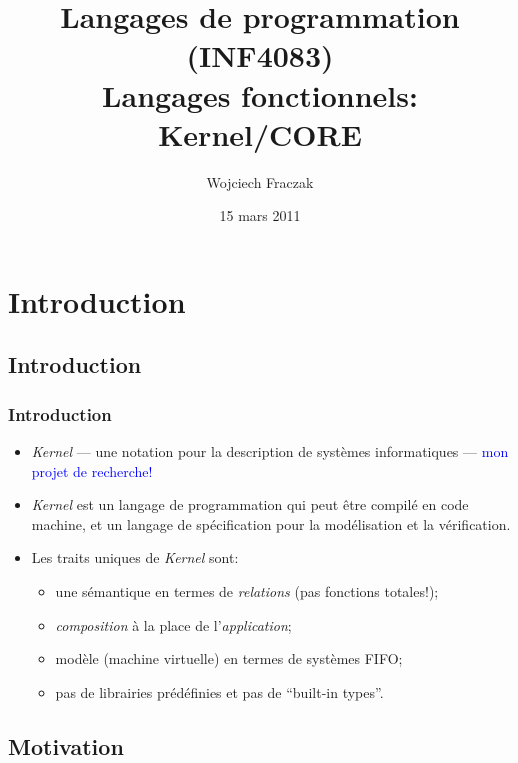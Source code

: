 \documentclass{beamer}
\title[INF4083: Kernel/CORE]{Langages de programmation (INF4083) \\
  Langages fonctionnels: Kernel/CORE}
\author{Wojciech Fraczak}
\date{15 mars 2011}
\newcommand{\mypause}{\pause}
\newcommand{\Kernel}{\textit{Kernel}}
\begin{document}
\begin{frame}
  \maketitle
\end{frame}


\section{Introduction}
\subsection{Introduction}
\begin{frame}
  \frametitle{Introduction}
  \begin{itemize}
  \item \Kernel{} --- une notation pour la description de systèmes
    informatiques --- \textcolor{blue}{mon projet de recherche!} \mypause
  \item \Kernel{} est un langage de programmation qui peut être compilé
    en code machine, et un langage de  spécification pour la
    modélisation et la vérification. \mypause
  \item Les traits uniques de \Kernel{} sont:
    \begin{itemize}
    \item une sémantique en termes de \alert{\emph{relations}} (pas fonctions totales!);
    \item \alert{\emph{composition}} à la place de l'\emph{application};
    \item modèle (machine virtuelle) en  termes de \alert{systèmes FIFO};
    \item pas de librairies prédéfinies et pas de ``built-in types''. 
    \end{itemize}
  \end{itemize}
\end{frame}

\subsection{Motivation}
\end{document}
